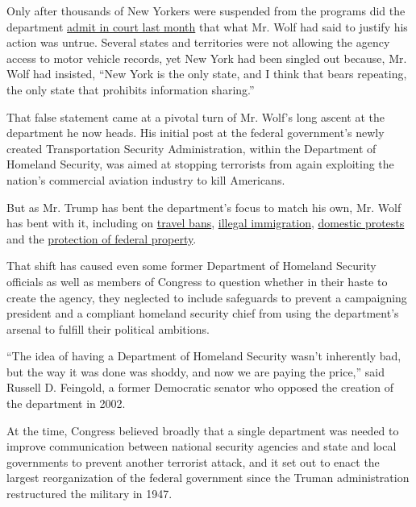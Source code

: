 Only after thousands of New Yorkers were suspended from the programs did
the department
\href{https://www.nytimes3xbfgragh.onion/2020/07/23/nyregion/trusted-traveler-homeland-security.html}{admit
in court last month} that what Mr. Wolf had said to justify his action
was untrue. Several states and territories were not allowing the agency
access to motor vehicle records, yet New York had been singled out
because, Mr. Wolf had insisted, ``New York is the only state, and I
think that bears repeating, the only state that prohibits information
sharing.''

That false statement came at a pivotal turn of Mr. Wolf's long ascent at
the department he now heads. His initial post at the federal
government's newly created Transportation Security Administration,
within the Department of Homeland Security, was aimed at stopping
terrorists from again exploiting the nation's commercial aviation
industry to kill Americans.

But as Mr. Trump has bent the department's focus to match his own, Mr.
Wolf has bent with it, including on
\href{https://www.nytimes3xbfgragh.onion/2020/01/31/us/politics/trump-travel-ban.html}{travel
bans},
\href{https://www.nytimes3xbfgragh.onion/2020/03/20/us/politics/trump-border-coronavirus.html}{illegal
immigration},
\href{https://www.nytimes3xbfgragh.onion/2020/07/28/us/federal-agents-portland-seattle-protests.html}{domestic
protests} and the
\href{https://www.nytimes3xbfgragh.onion/2020/07/10/us/politics/homeland-security-statues-trump.html}{protection
of federal property}.

That shift has caused even some former Department of Homeland Security
officials as well as members of Congress to question whether in their
haste to create the agency, they neglected to include safeguards to
prevent a campaigning president and a compliant homeland security chief
from using the department's arsenal to fulfill their political
ambitions.

``The idea of having a Department of Homeland Security wasn't inherently
bad, but the way it was done was shoddy, and now we are paying the
price,'' said Russell D. Feingold, a former Democratic senator who
opposed the creation of the department in 2002.

At the time, Congress believed broadly that a single department was
needed to improve communication between national security agencies and
state and local governments to prevent another terrorist attack, and it
set out to enact the largest reorganization of the federal government
since the Truman administration restructured the military in 1947.

